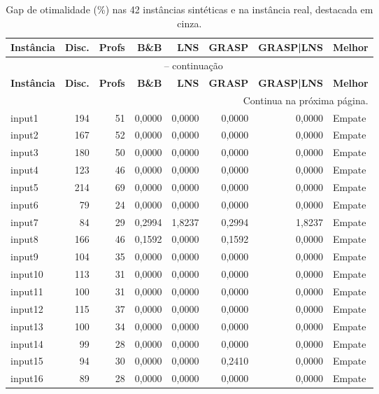 \begingroup
\setlength{\tabcolsep}{3pt}
\scriptsize
\begin{longtable}{@{}lrrrrrrl@{}}
\caption{Gap de otimalidade (\%) nas 42 instâncias sintéticas e na instância real, destacada em cinza.}\label{tab:geral_gap}\\
\toprule
\textbf{Instância} & \textbf{Disc.} & \textbf{Profs} & \textbf{B\&B} & \textbf{LNS} & \textbf{GRASP} & \textbf{GRASP|LNS} & \textbf{Melhor} \\
\midrule
\endfirsthead
\multicolumn{8}{c}{\tablename\ \thetable{} -- continuação}\\
\toprule
\textbf{Instância} & \textbf{Disc.} & \textbf{Profs} & \textbf{B\&B} & \textbf{LNS} & \textbf{GRASP} & \textbf{GRASP|LNS} & \textbf{Melhor} \\
\midrule
\endhead
\midrule
\multicolumn{8}{r}{Continua na próxima página.}\\
\endfoot
\bottomrule
\endlastfoot
input1 & 194 & 51 & 0,0000 & 0,0000 & 0,0000 & 0,0000 & Empate \\
input2 & 167 & 52 & 0,0000 & 0,0000 & 0,0000 & 0,0000 & Empate \\
input3 & 180 & 50 & 0,0000 & 0,0000 & 0,0000 & 0,0000 & Empate \\
input4 & 123 & 46 & 0,0000 & 0,0000 & 0,0000 & 0,0000 & Empate \\
input5 & 214 & 69 & 0,0000 & 0,0000 & 0,0000 & 0,0000 & Empate \\
input6 & 79 & 24 & 0,0000 & 0,0000 & 0,0000 & 0,0000 & Empate \\
input7 & 84 & 29 & 0,2994 & 1,8237 & 0,2994 & 1,8237 & Empate \\
input8 & 166 & 46 & 0,1592 & 0,0000 & 0,1592 & 0,0000 & Empate \\
input9 & 104 & 35 & 0,0000 & 0,0000 & 0,0000 & 0,0000 & Empate \\
input10 & 113 & 31 & 0,0000 & 0,0000 & 0,0000 & 0,0000 & Empate \\
input11 & 100 & 31 & 0,0000 & 0,0000 & 0,0000 & 0,0000 & Empate \\
input12 & 115 & 37 & 0,0000 & 0,0000 & 0,0000 & 0,0000 & Empate \\
input13 & 100 & 34 & 0,0000 & 0,0000 & 0,0000 & 0,0000 & Empate \\
input14 & 99 & 28 & 0,0000 & 0,0000 & 0,0000 & 0,0000 & Empate \\
input15 & 94 & 30 & 0,0000 & 0,0000 & 0,2410 & 0,0000 & Empate \\
input16 & 89 & 28 & 0,0000 & 0,0000 & 0,0000 & 0,0000 & Empate \\

\end{longtable}
